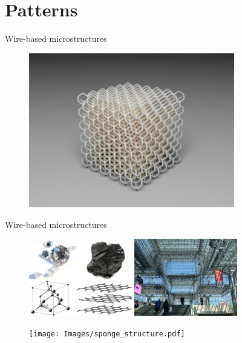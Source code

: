 \section{Patterns}

\begin{frame}{Wire-based microstructures}
\begin{figure}
\includegraphics[width=0.8\textwidth]{Images/diamond_cube.png}
\end{figure}
\end{frame}

\begin{frame}{Wire-based microstructures}
\begin{figure}
\centering
\hspace{\fill}
\includegraphics[width=0.4\textwidth]{Images/molecular_structures.png}
\hspace{\fill}
\pause \includegraphics[width=0.4\textwidth]{Images/javits_center.png}
\hspace{\fill}

\vspace{3mm}
\pause \texttt{[image: Images/sponge\_structure.pdf]}
\end{figure}
\end{frame}

